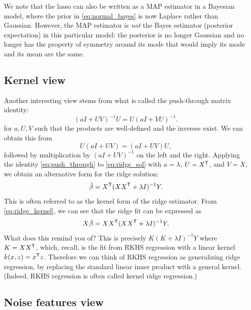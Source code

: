 \documentclass{article}
\begin{document}
We note that the lasso can also be written as a MAP estimator in a Bayesian 
model, where the prior in \eqref{eq:normal_bayes} is now Laplace rather than  
Gaussian. However, the MAP estimator is \emph{not} the Bayes estimator
(posterior expectation) in this particular model: the posterior is no longer
Gaussian and no longer has the property of symmetry around its mode that would
imply its mode and its mean are the same.   

\subsection{Kernel view}

Another interesting view stems from what is called the push-through matrix
identity:
\begin{equation}
\label{eq:push_through}
(aI + UV)^{-1} U = U (aI + VU)^{-1}.
\end{equation}
for $a,U,V$ such that the products are well-defined and the inverses exist. We
can obtain this from
\[
U (aI + UV) = (aI + UV) U,
\]
followed by multiplication by $(aI + UV)^{-1}$ on the left and the right. 
Applying the identity \eqref{eq:push_through} to \eqref{eq:ridge_sol} with
$a=\lambda$, $U=X^{\mathsf{T}}$, and $V=X$, we obtain an alternative form for the ridge
solution:  
\begin{equation}
\label{eq:ridge_kernel}
\hat{\beta} = X^{\mathsf{T}} (XX^{\mathsf{T}} + \lambda I)^{-1} Y.
\end{equation}
This is often referred to as the kernel form of the ridge estimator. From
\eqref{eq:ridge_kernel}, we can see that the ridge fit can be expressed as
\[
X\hat{\beta} = XX^{\mathsf{T}} (XX^{\mathsf{T}} + \lambda I)^{-1} Y.
\]
What does this remind you of? This is precisely $K(K + \lambda I)^{-1} Y$ where
$K = XX^{\mathsf{T}}$, which, recall, is the fit from RKHS regression with a linear kernel 
$k(x,z) = x^{\mathsf{T}} z$. Therefore we can think of RKHS regression as generalizing
ridge regression, by replacing the standard linear inner product with a general
kernel. (Indeed, RKHS regression is often called kernel ridge regression.)

\subsection{Noise features view}

\def\asto{\overset{\mathrm{as}}{\to}}
\end{document}
